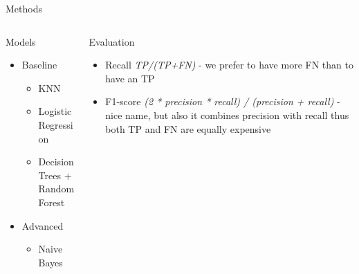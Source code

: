 \documentclass{beamer}
\begin{document}
\begin{frame}[t]{Methods}

\begin{columns}
\begin{column}[t]{0.4\textwidth}
Models

\begin{itemize}
\item Baseline
\begin{itemize}
    \item KNN
    \item Logistic Regression
    \item Decision Trees + Random Forest
\end{itemize}
\item Advanced
\begin{itemize}
	\item Naive Bayes
\end{itemize}
\end{itemize}

\pause

\end{column}
\begin{column}[t]{0.6\textwidth}
Evaluation

\begin{itemize}
\item Recall {\it TP/(TP+FN)} - we prefer to have more FN than to have an TP
\item F1-score {\it (2 * precision * recall) / (precision + recall)} - nice name, but also it combines precision with recall thus both TP and FN are equally expensive
\end{itemize}

\end{column}

\end{columns}

\end{frame}
\end{document}
